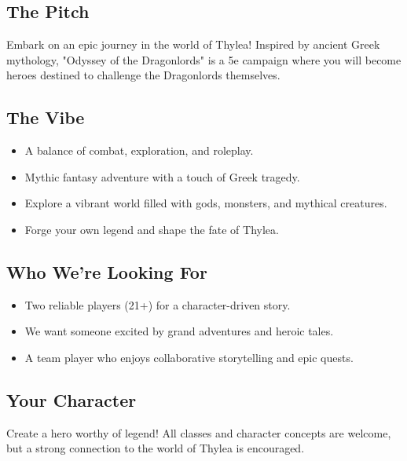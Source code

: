 \documentclass[a4paper, 8pt]{extarticle}
\begin{document}
\color{OODL_Blue}


\vspace{2cm}

\subsection*{\textbf{The Pitch}}
\vspace{-1mm}
Embark on an epic journey in the world of Thylea! Inspired by ancient Greek mythology, "Odyssey of the Dragonlords" is a 5e campaign where you will become heroes destined to challenge the Dragonlords themselves.

\vspace{-1mm}
\subsection*{\textbf{The Vibe}}
\begin{itemize}[itemsep=-1mm]
    \item A balance of combat, exploration, and roleplay.
    \item Mythic fantasy adventure with a touch of Greek tragedy.
    \item Explore a vibrant world filled with gods, monsters, and mythical creatures.
    \item Forge your own legend and shape the fate of Thylea.
\end{itemize}

\vspace{-1mm}
\subsection*{\textbf{Who We're Looking For}}
\begin{itemize}[itemsep=-1mm]
    \item Two reliable players (21+) for a character-driven story.
    \item We want someone excited by grand adventures and heroic tales.
    \item A team player who enjoys collaborative storytelling and epic quests.
\end{itemize}

\vspace{-1mm}
\subsection*{\textbf{Your Character}}
\vspace{-1mm}
Create a hero worthy of legend! All classes and character concepts are welcome, but a strong connection to the world of Thylea is encouraged.
\end{document}
